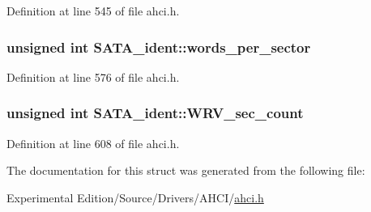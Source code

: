 Definition at line 545 of file ahci.\+h.

\subsubsection[{\texorpdfstring{words\+\_\+per\+\_\+sector}{words_per_sector}}]{\setlength{\rightskip}{0pt plus 5cm}unsigned int S\+A\+T\+A\+\_\+ident\+::words\+\_\+per\+\_\+sector}\hypertarget{structSATA__ident_a0c0d441c5e9cfd17d9dfa69c102ecafd}{}\label{structSATA__ident_a0c0d441c5e9cfd17d9dfa69c102ecafd}


Definition at line 576 of file ahci.\+h.

\subsubsection[{\texorpdfstring{W\+R\+V\+\_\+sec\+\_\+count}{WRV_sec_count}}]{\setlength{\rightskip}{0pt plus 5cm}unsigned int S\+A\+T\+A\+\_\+ident\+::\+W\+R\+V\+\_\+sec\+\_\+count}\hypertarget{structSATA__ident_a9666dd870fe2ef49ea21adb0b897022d}{}\label{structSATA__ident_a9666dd870fe2ef49ea21adb0b897022d}


Definition at line 608 of file ahci.\+h.



The documentation for this struct was generated from the following file\+:\begin{DoxyCompactItemize}
\item 
Experimental Edition/\+Source/\+Drivers/\+A\+H\+C\+I/\hyperlink{ahci_8h}{ahci.\+h}\end{DoxyCompactItemize}
